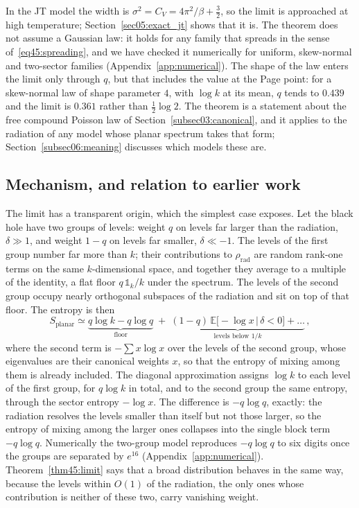 \documentclass[11pt,letterpaper]{article}
\theoremstyle{plain}
\theoremstyle{definition}
\theoremstyle{remark}
\begin{document}
In the JT model the width is $\sigma^2 = C_V = 4\pi^2/\beta + \tfrac32$, so the limit is approached at high temperature; Section~\ref{sec05:exact_jt} shows that it is. The theorem does not assume a Gaussian law: it holds for any family that spreads in the sense of~\eqref{eq45:spreading}, and we have checked it numerically for uniform, skew-normal and two-sector families (Appendix~\ref{app:numerical}). The shape of the law enters the limit only through $q$, but that includes the value at the Page point: for a skew-normal law of shape parameter $4$, with $\log k$ at its mean, $q$ tends to $0.439$ and the limit is $0.361$ rather than $\tfrac12\log 2$. The theorem is a statement about the free compound Poisson law of Section~\ref{subsec03:canonical}, and it applies to the radiation of any model whose planar spectrum takes that form; Section~\ref{subsec06:meaning} discusses which models these are.

\subsection{Mechanism, and relation to earlier work}
\label{subsec45:mechanism}

The limit has a transparent origin, which the simplest case exposes. Let the black hole have two groups of levels: weight $q$ on levels far larger than the radiation, $\delta \gg 1$, and weight $1-q$ on levels far smaller, $\delta \ll -1$. The levels of the first group number far more than $k$; their contributions to $\rho_{\mathrm{rad}}$ are random rank-one terms on the same $k$-dimensional space, and together they average to a multiple of the identity, a flat floor $q\,\mathbb{1}_k/k$ under the spectrum. The levels of the second group occupy nearly orthogonal subspaces of the radiation and sit on top of that floor. The entropy is then
\begin{equation}
\label{eq45:two_sector}
S_{\mathrm{planar}} \simeq \underbrace{q\log k - q\log q}_{\text{floor}} \;+\; \underbrace{(1-q)\,\mathbb{E}\big[-\log x \,\big|\, \delta < 0\big] + \dots}_{\text{levels below } 1/k}\,,
\end{equation}
where the second term is $-\sum x\log x$ over the levels of the second group, whose eigenvalues are their canonical weights $x$, so that the entropy of mixing among them is already included. The diagonal approximation assigns $\log k$ to each level of the first group, for $q\log k$ in total, and to the second group the same entropy, through the sector entropy $-\log x$. The difference is $-q\log q$, exactly: the radiation resolves the levels smaller than itself but not those larger, so the entropy of mixing among the larger ones collapses into the single block term $-q\log q$. Numerically the two-group model reproduces $-q\log q$ to six digits once the groups are separated by $e^{16}$ (Appendix~\ref{app:numerical}). Theorem~\ref{thm45:limit} says that a broad distribution behaves in the same way, because the levels within $O(1)$ of the radiation, the only ones whose contribution is neither of these two, carry vanishing weight.
\end{document}
